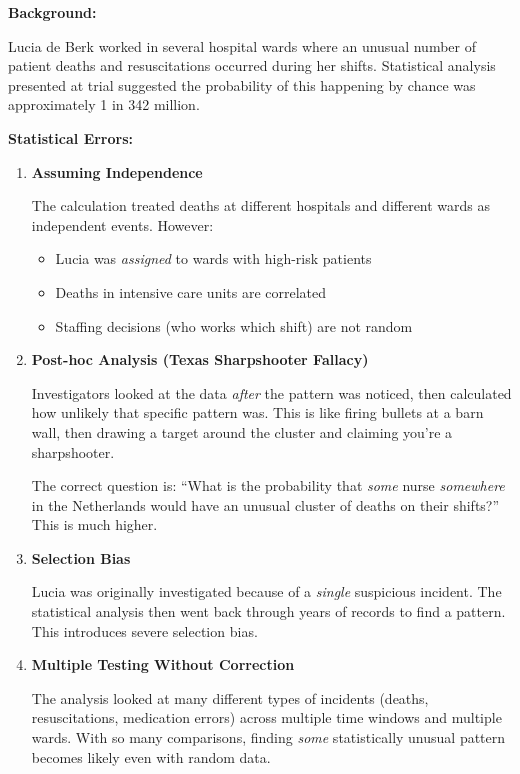 \documentclass[11pt,a4paper]{article}
\begin{document}
\begin{answer}
\textbf{Background:}

Lucia de Berk worked in several hospital wards where an unusual number of patient deaths and resuscitations occurred during her shifts. Statistical analysis presented at trial suggested the probability of this happening by chance was approximately 1 in 342 million.

\vspace{0.3cm}
\textbf{Statistical Errors:}

\begin{enumerate}[leftmargin=*]
    \item \textbf{Assuming Independence}
    
    The calculation treated deaths at different hospitals and different wards as independent events. However:
    \begin{itemize}
        \item Lucia was \textit{assigned} to wards with high-risk patients
        \item Deaths in intensive care units are correlated
        \item Staffing decisions (who works which shift) are not random
    \end{itemize}
    
    \item \textbf{Post-hoc Analysis (Texas Sharpshooter Fallacy)}
    
    Investigators looked at the data \textit{after} the pattern was noticed, then calculated how unlikely that specific pattern was. This is like firing bullets at a barn wall, then drawing a target around the cluster and claiming you're a sharpshooter.
    
    The correct question is: ``What is the probability that \textit{some} nurse \textit{somewhere} in the Netherlands would have an unusual cluster of deaths on their shifts?'' This is much higher.
    
    \item \textbf{Selection Bias}
    
    Lucia was originally investigated because of a \textit{single} suspicious incident. The statistical analysis then went back through years of records to find a pattern. This introduces severe selection bias.
    
    \item \textbf{Multiple Testing Without Correction}
    
    The analysis looked at many different types of incidents (deaths, resuscitations, medication errors) across multiple time windows and multiple wards. With so many comparisons, finding \textit{some} statistically unusual pattern becomes likely even with random data.
    

\end{enumerate}
\end{answer}
\end{document}
